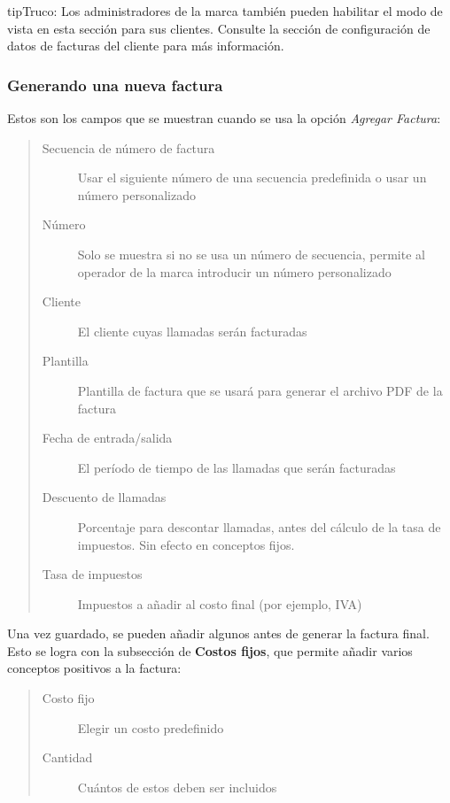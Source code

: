 \documentclass[letterpaper,10pt,spanish]{sphinxmanual}
\begin{document}
\begin{notice}{tip}{Truco:}
Los administradores de la marca también pueden habilitar el modo de vista en esta sección para sus clientes. Consulte la sección de configuración de datos de facturas del cliente para más información.
\end{notice}


\subsubsection{Generando una nueva factura}
\label{administration_portal/brand/invoicing/invoices:generating-a-new-invoice}
Estos son los campos que se muestran cuando se usa la opción \emph{Agregar Factura}:
\begin{quote}
\begin{description}
\item[{Secuencia de número de factura}] \leavevmode
Usar el siguiente número de una secuencia predefinida o usar un número personalizado

\item[{Número}] \leavevmode
Solo se muestra si no se usa un número de secuencia, permite al operador de la marca introducir un número personalizado

\item[{Cliente}] \leavevmode
El cliente cuyas llamadas serán facturadas

\item[{Plantilla}] \leavevmode
Plantilla de factura que se usará para generar el archivo PDF de la factura

\item[{Fecha de entrada/salida}] \leavevmode
El período de tiempo de las llamadas que serán facturadas

\item[{Descuento de llamadas}] \leavevmode
Porcentaje para descontar llamadas, antes del cálculo de la tasa de impuestos. Sin efecto en conceptos fijos.

\item[{Tasa de impuestos}] \leavevmode
Impuestos a añadir al costo final (por ejemplo, IVA)

\end{description}
\end{quote}

Una vez guardado, se pueden añadir algunos {\hyperref[administration_portal/brand/invoicing/fixed_costs:fixed\string-costs]{}} antes de generar la factura final. Esto se logra con la subsección de \textbf{Costos fijos}, que permite añadir varios conceptos positivos a la factura:
\begin{quote}
\begin{description}
\item[{Costo fijo}] \leavevmode
Elegir un costo predefinido

\item[{Cantidad}] \leavevmode
Cuántos de estos deben ser incluidos

\end{description}
\end{quote}
\end{document}
